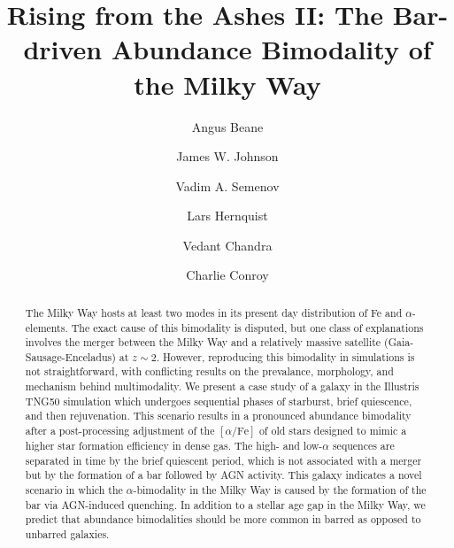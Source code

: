\documentclass[twocolumn,linenumbers]{aastex631}
\newcommand{\alphaFe}{\ensuremath{[\alpha/\textrm{Fe}]}}
\begin{document}
\title{Rising from the Ashes II: The Bar-driven Abundance Bimodality of the Milky Way}

\author{Angus Beane}

\author{James W. Johnson}

\author{Vadim A. Semenov}

\author{Lars Hernquist}

\author{Vedant Chandra}

\author{Charlie Conroy}

\begin{abstract}
    The Milky Way hosts at least two modes in its present day distribution of Fe and $\alpha$-elements. The exact cause of this bimodality is disputed, but one class of explanations involves the merger between the Milky Way and a relatively massive satellite (Gaia-Sausage-Enceladus) at $z\sim2$. However, reproducing this bimodality in simulations is not straightforward, with conflicting results on the prevalance, morphology, and mechanism behind multimodality. We present a case study of a galaxy in the Illustris TNG50 simulation which undergoes sequential phases of starburst, brief quiescence, and then rejuvenation. This scenario results in a pronounced abundance bimodality after a post-processing adjustment of the \alphaFe{} of old stars designed to mimic a higher star formation efficiency in dense gas. The high- and low-$\alpha$ sequences are separated in time by the brief quiescent period, which is not associated with a merger but by the formation of a bar followed by AGN activity. This galaxy indicates a novel scenario in which the $\alpha$-bimodality in the Milky Way is caused by the formation of the bar via AGN-induced quenching. In addition to a stellar age gap in the Milky Way, we predict that abundance bimodalities should be more common in barred as opposed to unbarred galaxies.
  \end{abstract}
    
\end{document}
